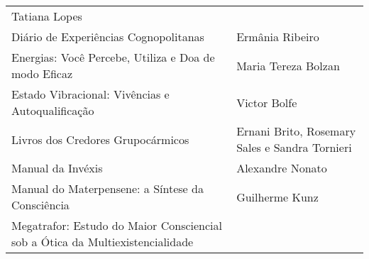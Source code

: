 \documentclass[
]{article}
\begin{document}
\begin{longtable}[]{@{}
  >{\raggedright\arraybackslash}p{}
  >{\raggedright\arraybackslash}p{}@{}}
\begin{minipage}[b]{\linewidth}
Tatiana Lopes
\end{minipage} \\
\begin{minipage}[b]{\linewidth}\raggedright
Diário de Experiências Cognopolitanas
\end{minipage} & \begin{minipage}[b]{\linewidth}\raggedright
Ermânia Ribeiro
\end{minipage} \\
\begin{minipage}[b]{\linewidth}\raggedright
Energias: Você Percebe, Utiliza e Doa de modo Eficaz
\end{minipage} & \begin{minipage}[b]{\linewidth}\raggedright
Maria Tereza Bolzan
\end{minipage} \\
\begin{minipage}[b]{\linewidth}\raggedright
Estado Vibracional: Vivências e Autoqualificação
\end{minipage} & \begin{minipage}[b]{\linewidth}\raggedright
Victor Bolfe
\end{minipage} \\
\begin{minipage}[b]{\linewidth}\raggedright
Livros dos Credores Grupocármicos
\end{minipage} & \begin{minipage}[b]{\linewidth}\raggedright
Ernani Brito, Rosemary Sales e Sandra Tornieri
\end{minipage} \\
\begin{minipage}[b]{\linewidth}\raggedright
Manual da Invéxis
\end{minipage} & \begin{minipage}[b]{\linewidth}\raggedright
Alexandre Nonato
\end{minipage} \\
\begin{minipage}[b]{\linewidth}\raggedright
Manual do Materpensene: a Síntese da Consciência
\end{minipage} & \begin{minipage}[b]{\linewidth}\raggedright
Guilherme Kunz
\end{minipage} \\
\begin{minipage}[b]{\linewidth}\raggedright
Megatrafor: Estudo do Maior Consciencial sob a Ótica da Multiexistencialidade
\end{minipage} & \begin{minipage}[b]{\linewidth}\raggedright

\end{minipage}
\end{longtable}
\end{document}
